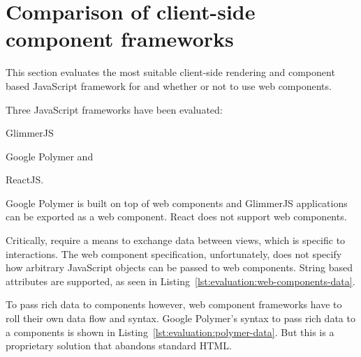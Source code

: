 
\section{Comparison of client-side component frameworks}\label{sec:analysis:frontend-framework-comparison}

This section evaluates the most suitable client-side rendering and component based JavaScript framework for \cmvs{} and whether or not to use web components.

Three JavaScript frameworks have been evaluated:
\begin{enumerate*}[label=(\arabic*)]
  \item GlimmerJS
  \item Google Polymer and
  \item ReactJS.
\end{enumerate*}
Google Polymer is built on top of web components and GlimmerJS applications can be exported as a web component.
React does not support web components.

Critically, \cmvs{} require a means to exchange data between views, which is specific to interactions.
The web component specification, unfortunately, does not specify how arbitrary JavaScript objects can be passed to web components.
String based attributes are supported, as seen in Listing~\ref{lst:evaluation:web-components-data}.

To pass rich data to components however, web component frameworks have to roll their own data flow and syntax.
Google Polymer's syntax to pass rich data to a components is shown in Listing~\ref{lst:evaluation:polymer-data}.
But this is a proprietary solution that abandons standard HTML.






